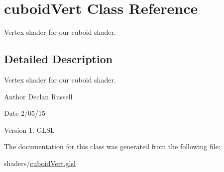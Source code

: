 \hypertarget{classcuboid_vert}{\section{cuboid\-Vert Class Reference}
\label{classcuboid_vert}
}


Vertex shader for our cuboid shader.  




\subsection{Detailed Description}
Vertex shader for our cuboid shader. 

\begin{DoxyAuthor}{Author}
Declan Russell 
\end{DoxyAuthor}
\begin{DoxyDate}{Date}
2/05/15 
\end{DoxyDate}
\begin{DoxyVersion}{Version}
1.  G\-L\-S\-L 
\end{DoxyVersion}


The documentation for this class was generated from the following file\-:\begin{DoxyCompactItemize}
\item 
shaders/\hyperlink{cuboid_vert_8glsl}{cuboid\-Vert.\-glsl}\end{DoxyCompactItemize}
